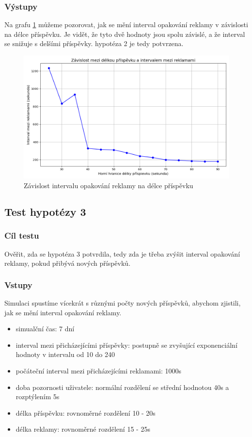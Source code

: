 \documentclass[11pt, a4paper]{article}
\begin{document}
\subsubsection{Výstupy}

Na grafu \ref{fig:post_length_vs_ad_interval} můžeme pozorovat, jak se mění interval opakování reklamy v závislosti na délce příspěvku.
Je vidět, že tyto dvě hodnoty jsou spolu závislé, a že interval se snižuje s delšími příspěvky.
hypotéza 2 je tedy potvrzena.
\begin{figure}[h]
    \centering
    \includegraphics[width=\linewidth]{post_length_vs_ad_interval.png}
    \caption{Závislost intervalu opakování reklamy na délce příspěvku}
    \label{fig:post_length_vs_ad_interval}
\end{figure}
\newpage

\subsection{Test hypotézy 3}
\subsubsection{Cíl testu}
Ověřit, zda se hypotéza 3 potvrdila, tedy zda je třeba zvýšit interval opakování reklamy, pokud přibývá nových příspěvků.
\subsubsection{Vstupy}
Simulaci spustíme vícekrát s různými počty nových příspěvků, abychom zjistili, jak se mění interval opakování reklamy.
\begin{itemize}
    \item simualční čas: 7 dní
    \item interval mezi přicházejícími příspěvky: postupně se zvyšující exponenciální hodnoty v intervalu od 10 do 240
    \item počáteční interval mezi přicházejícími reklamami: 1000s
    \item doba pozornosti uživatele: normální rozdělení se střední hodnotou 40s a rozptýlením 5s
    \item délka příspěvku: rovnoměrné rozdělení 10 - 20s
    \item délka reklamy: rovnoměrné rozdělení 15 - 25s

\end{itemize}
\end{document}
